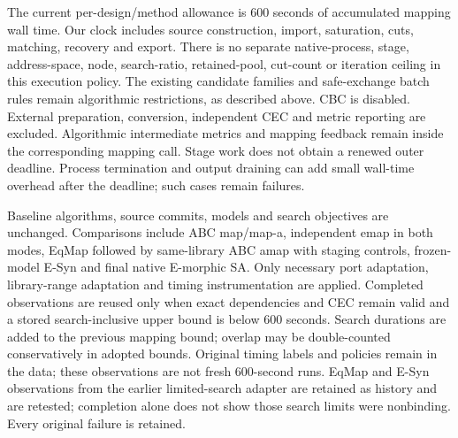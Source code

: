\documentclass[conference]{IEEEtran}
\begin{document}
The current per-design/method allowance is 600 seconds of accumulated mapping wall time. Our clock includes source construction, import, saturation, cuts, matching, recovery and export.
There is no separate native-process, stage, address-space, node, search-ratio, retained-pool, cut-count or iteration ceiling in this execution policy.
The existing candidate families and safe-exchange batch rules remain algorithmic restrictions, as described above. CBC is disabled.
External preparation, conversion, independent CEC and metric reporting are excluded. Algorithmic intermediate metrics and mapping feedback remain inside the corresponding mapping call.
Stage work does not obtain a renewed outer deadline. Process termination and output draining can add small wall-time overhead after the deadline; such cases remain failures.

Baseline algorithms, source commits, models and search objectives are unchanged. Comparisons include ABC map/map-a, independent emap in both modes, EqMap followed by same-library ABC amap with staging controls, frozen-model E-Syn and final native E-morphic SA.
Only necessary port adaptation, library-range adaptation and timing instrumentation are applied.
Completed observations are reused only when exact dependencies and CEC remain valid and a stored search-inclusive upper bound is below 600 seconds. Search durations are added to the previous mapping bound; overlap may be double-counted conservatively in adopted bounds. Original timing labels and policies remain in the data; these observations are not fresh 600-second runs.
EqMap and E-Syn observations from the earlier limited-search adapter are retained as history and are retested; completion alone does not show those search limits were nonbinding. Every original failure is retained.
\end{document}
